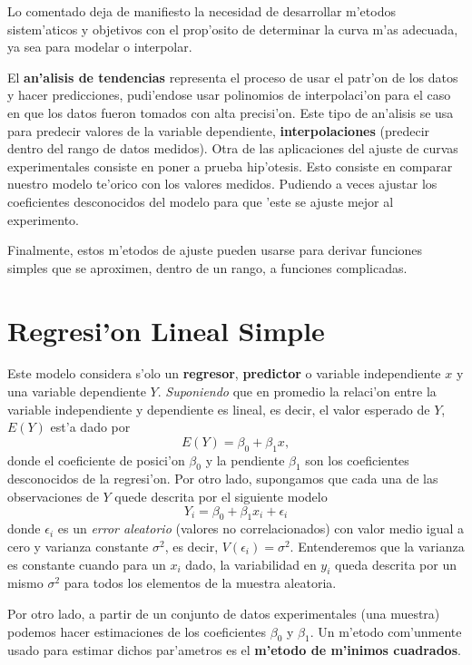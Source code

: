 \documentclass[a4paper]{report}
\begin{document}
Lo comentado deja de manifiesto la necesidad de desarrollar m'etodos sistem'aticos y objetivos con el prop'osito de determinar la curva m'as adecuada, ya sea para modelar o interpolar.

El \textbf{an'alisis de tendencias} representa el proceso de usar el patr'on de los datos y hacer predicciones, pudi'endose usar polinomios de interpolaci'on para el caso en que los datos fueron tomados con alta precisi'on. Este tipo de an'alisis se usa para predecir valores de la variable dependiente, \textbf{interpolaciones} (predecir dentro del rango de datos medidos).
Otra de las aplicaciones del ajuste de curvas experimentales consiste en poner a prueba hip'otesis. Esto consiste en comparar nuestro modelo te'orico con los valores medidos. Pudiendo a veces ajustar los coeficientes desconocidos del modelo para que 'este se ajuste mejor al experimento.

Finalmente, estos m'etodos de ajuste pueden usarse para derivar funciones simples que se aproximen, dentro de un rango, a funciones complicadas.

\section{Regresi'on Lineal Simple}

Este modelo considera s'olo un \textbf{regresor}, \textbf{predictor} o variable independiente $x$ y una variable dependiente $Y$. \textit{Suponiendo} que en promedio la relaci'on entre la variable independiente y dependiente es lineal, es decir, el valor esperado de $Y$, $E(Y)$ est'a dado por  
\begin{equation}
E(Y)=\beta_0 + \beta_1 x,
\end{equation}
donde el coeficiente de posici'on $\beta_0$ y la pendiente $\beta_1$ son los coeficientes desconocidos de la regresi'on. Por otro lado, supongamos que cada una de las observaciones de $Y$ quede descrita por el siguiente modelo
\begin{equation}
Y_i=\beta_0 + \beta_1 x_i +\epsilon_i
\end{equation}
donde $\epsilon_i$ es un \textit{error aleatorio} (valores no correlacionados) con valor medio igual a cero y varianza constante $\sigma^{2}$, es decir, $V(\epsilon_i)=\sigma^{2}$. Entenderemos que la varianza es constante cuando para un $x_i$ dado, la variabilidad en $y_i$ queda descrita por un mismo  $\sigma^{2}$ para todos los elementos de la muestra aleatoria. 

Por otro lado, a partir de un conjunto de datos experimentales (una muestra) podemos hacer estimaciones de los coeficientes $\beta_0$ y $\beta_1$.
Un m'etodo com'unmente usado para estimar dichos par'ametros es el \textbf{m'etodo de m'inimos cuadrados}. 
\end{document}
